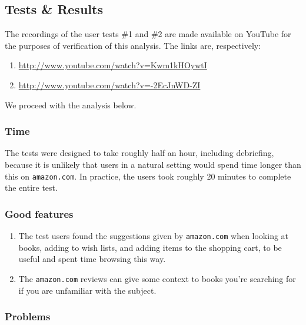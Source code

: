 \subsection{Tests \& Results}

The recordings of the user tests \#1 and \#2 are made available on YouTube for
the purposes of verification of this analysis. The links are, respectively:

\begin{enumerate}

\item \url{http://www.youtube.com/watch?v=Kwm1kHOywtI}

\item \url{http://www.youtube.com/watch?v=-2EcJnWD-ZI}

\end{enumerate}

We proceed with the analysis below.

\subsubsection{Time}

The tests were designed to take roughly half an hour, including debriefing,
because it is unlikely that users in a natural setting would spend time longer
than this on \texttt{amazon.com}. In practice, the users took roughly 20
minutes to complete the entire test.

\subsubsection{Good features}

\begin{enumerate}

\item The test users found the suggestions given by \texttt{amazon.com} when
looking at books, adding to wish lists, and adding items to the shopping cart,
to be useful and spent time browsing this way.

\item The \texttt{amazon.com} reviews can give some context to books you're
searching for if you are unfamiliar with the subject.

\end{enumerate}

\subsubsection{Problems}

